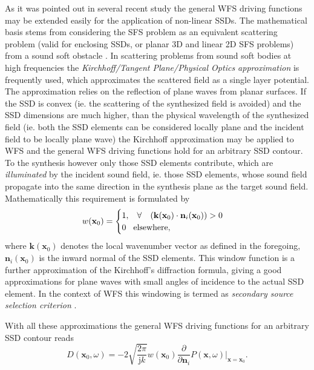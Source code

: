 \documentclass[12pt,a4paper]{article}
\newcommand{\ti}{\mathrm{j}}
\newcommand{\vx}{\mathbf{x}}
\newcommand{\vxo}{\mathbf{x}_0}
\begin{document}
As it was pointed out in several recent study \cite{Ahrens2012, Fazi2013:Equivalent_scattering, Zotter2013:uniqueness} the general WFS driving functions may be extended easily for the application of non-linear SSDs. The mathematical basis stems from considering the SFS problem as an equivalent scattering problem (valid for enclosing SSDs, or planar 3D and linear 2D SFS problems) from a sound soft obstacle \cite{Fazi2013:Equivalent_scattering}. In scattering problems from sound soft bodies at high frequencies the \emph{Kirchhoff/Tangent Plane/Physical Optics approximation} is frequently used, which approximates the scattered field as a single layer potential. The approximation relies on the reflection of plane waves from planar surfaces. If the SSD is convex (ie. the scattering of the synthesized field is avoided) and the SSD dimensions are much higher, than the physical wavelength of the synthesized field (ie. both the SSD elements can be considered locally plane and the incident field to be locally plane wave) the Kirchhoff approximation may be applied to WFS and the general WFS driving functions hold for an arbitrary SSD contour.
To the synthesis however only those SSD elements contribute, which are \emph{illuminated} by the incident sound field, ie. those SSD elements, whose sound field propagate into the same direction in the synthesis plane as the target sound field. Mathematically this requirement is formulated by
\begin{equation}
w(\vxo) = \begin{cases}
                        1, \hspace{3mm} \forall \hspace{3mm} \left( \mathbf{k}(\vxo) \cdot \mathbf{n}_i(\vxo) \right) > 0 \\
                        0  \hspace{3mm} \text{elsewhere},
                    \end{cases}
\end{equation}
where $\mathbf{k}(\vxo)$ denotes the local wavenumber vector as defined in the foregoing, $ \mathbf{n}_i(\vxo)$ is the inward normal of the SSD elements. This window function is a further approximation of the Kirchhoff's diffraction formula, giving a good approximations for plane waves with small angles of incidence to the actual SSD element.
In the context of WFS this windowing is termed as \emph{secondary source selection criterion} \cite{Spors2007, Spors2007:DAGA:SS_selection_criterion}.

With all these approximations the general WFS driving functions for an arbitrary SSD contour reads
\begin{equation}
D(\vxo,\omega) = -2 \sqrt{\frac{2\pi}{\ti k}} w(\vxo) \frac{\partial}{\partial \mathbf{n}_i} \left. P(\vx,\omega) \right|_{\vx = \vxo}.
\end{equation}
\end{document}
